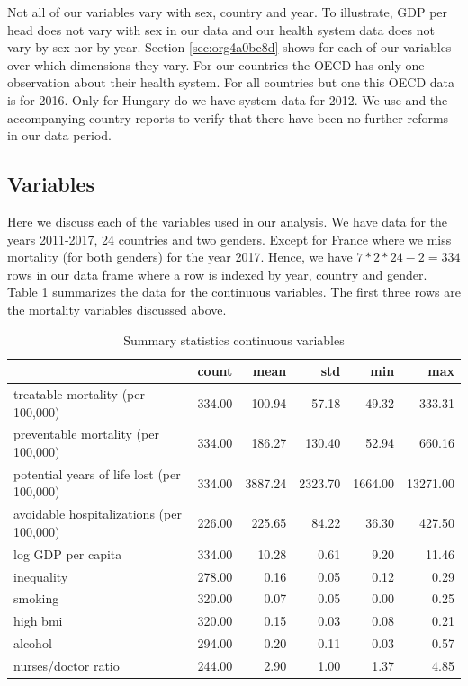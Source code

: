 \documentclass[a4paper,12pt]{article}
\begin{document}
Not all of our variables vary with sex, country and year. To illustrate, GDP per head does not vary with sex in our data and our health system data does not vary by sex nor by year. Section \ref{sec:org4a0be8d} shows for each of our variables over which dimensions they vary. For our countries the OECD has only one observation about their health system. For all countries but one this OECD data is for 2016. Only for Hungary do we have system data for 2012. We use \cite{countryprofileReport} and the accompanying country reports to verify that there have been no further reforms in our data period.


\subsection{Variables}
\label{sec:org62760d2}

Here we discuss each of the variables used in our analysis. We have data for the years 2011-2017, 24 countries and two genders. Except for France where we miss mortality (for both genders) for the year 2017. Hence, we have \(7*2*24-2=334\) rows in our data frame where a row is indexed by year, country and gender. Table \ref{tab:summary_variables} summarizes the data for the continuous variables. The first three rows are the mortality variables discussed above.

\begin{table}[htbp]
\caption{\label{tab:summary_variables}Summary statistics continuous variables}
\centering
\begin{tabular}{lrrrrr}
 & count & mean & std & min & max\\
\hline
treatable mortality (per 100,000) & 334.00 & 100.94 & 57.18 & 49.32 & 333.31\\
preventable mortality (per 100,000) & 334.00 & 186.27 & 130.40 & 52.94 & 660.16\\
potential years of life lost (per 100,000) & 334.00 & 3887.24 & 2323.70 & 1664.00 & 13271.00\\
avoidable hospitalizations (per 100,000) & 226.00 & 225.65 & 84.22 & 36.30 & 427.50\\
log GDP per capita & 334.00 & 10.28 & 0.61 & 9.20 & 11.46\\
inequality & 278.00 & 0.16 & 0.05 & 0.12 & 0.29\\
smoking & 320.00 & 0.07 & 0.05 & 0.00 & 0.25\\
high bmi & 320.00 & 0.15 & 0.03 & 0.08 & 0.21\\
alcohol & 294.00 & 0.20 & 0.11 & 0.03 & 0.57\\
nurses/doctor ratio & 244.00 & 2.90 & 1.00 & 1.37 & 4.85\\
\end{tabular}
\end{table}
\end{document}

